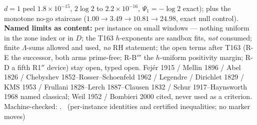 $d=1$ peel $1.8\times10^{-15}$, $2\log2$ to $2.2\times10^{-16}$,
$\Psi_1=-\log2$ exact); plus the monotone no-go staircase
($1.00\to3.49\to10.81\to24.98$, exact null control).
\textbf{Named limits as content:} per instance on small windows ---
nothing uniform in the zone index or in $D$; the T163 $h$-exponents are
sandbox fits, \emph{not} consumed; finite $\Lambda$-sums allowed and
used, \emph{no} RH statement; the open terms after T163 (R-E the
successor, both arms prime-free; R-B$'''$ the $h$-uniform positivity
margin; R-D a fifth R1$''$ device) stay open, typed open.
Fej\'er 1915 / Mellin 1896 / Abel 1826 / Chebyshev 1852--Rosser--Schoenfeld
1962 / Legendre / Dirichlet 1829 / KMS 1953 / Frullani 1828--Lerch
1887--Clausen 1832 / Schur 1917--Haynsworth 1968 named classical; Weil
1952 / Bombieri 2000 cited, never used as a criterion.
Machine-checked:
.
\mE\ (per-instance identities and certified inequalities; no marker moves)


